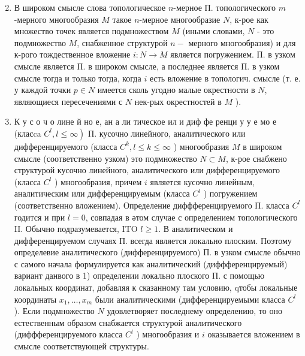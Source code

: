 \documentclass[10pt]{article}
\begin{document}
\begin{enumerate}

  \setcounter{enumi}{1}

  \item В широком смысле слова топологическое $n$-мерное П. топологического $m$-мерного многообразия $M$ такое $n$-мерное многообразие $N$, к-рое как множество точек является подмножеством $M$ (иными словами, $N$ - это подмножество $M$, снабженное структурой $n-$ мерного многообразия) и для к-рого тождественное вложение $i: N \rightarrow M$ является погружением. П. в узком смысле является П. в широком смысле, а последнее является П. в узком смысле тогда и только тогда, когда $i$ есть вложение в топологич. смысле (т. е. у каждой точки $p \in N$ имеется сколь угодно малые окрестности в $N$, являющиеся пересечениями с $N$ нек-рых окрестностей в $M$ ).



  \item К у с о ч о лине й но е, ан а ли тическое ил и диф фе ренци у у е мо е (класca $\left.C^{l}, l \leqslant \infty\right)$ П. кусочно линейного, аналитического или дифференцируемого (класса $C^{k}, l \leqslant k \leqslant \infty$ ) многообразия $M$ в широком смысле (соответственно узком) это подмножество $N \subset M$, к-рое снабжено структурой кусочно линейного, аналитического или дифференцируемого (класса $C^{l}$ ) многообразия, причем $i$ является кусочно линейным, аналитическим или дифференцируемым (класса $C^{l}$ ) погружением (соответственно вложением). Определение диффференцируемого П. класса $C^{l}$ годится и при $l=0$, совпадая в әтом случае с определением топологического II. Обычно подразумевается, ITO $l \geqslant 1$. В аналитическом и дифференцируемом случаях П. всегда является локально плоским. Поэтому определевие аналитического (дифференцируемого) П. в узком смысле обычно с самого начала формулируется как аналитический (диффференцируемый) вариант данвого в 1) определении локально плоского П. с помощью локальных координат, добавляя к сказанному там условию, qтобы локальные координаты $x_{1}, \ldots, x_{m}$ были аналитическими (дифференцируемыми класса $C^{l}$ ). Если подмножество $N$ удовлетворяет последнему определению, то оно естественным образом снабжается структурой аналитического (диффференцируемого класса $C^{l}$ ) многообразия и $i$ оказывается вложением в смысле соответствующей структуры.



\end{enumerate}
\end{document}

